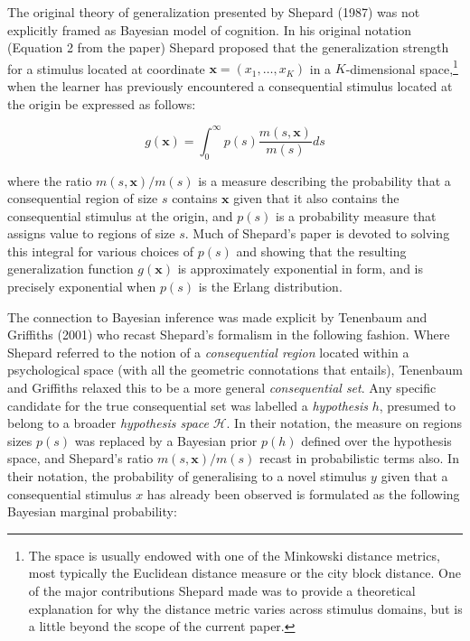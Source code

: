 \documentclass[english,doc]{apa6}
\begin{document}
The original theory of generalization presented by Shepard (1987) was not explicitly framed as Bayesian model of cognition. In his original notation (Equation 2 from the paper) Shepard proposed that the generalization strength for a stimulus located at coordinate \(\mathbf{x} = (x_1, \ldots, x_K)\) in a \(K\)-dimensional space,\footnote{The space is usually endowed with one of the Minkowski distance metrics, most typically the Euclidean distance measure or the city block distance. One of the major contributions Shepard made was to provide a theoretical explanation for why the distance metric varies across stimulus domains, but is a little beyond the scope of the current paper.} when the learner has previously encountered a consequential stimulus located at the origin be expressed as follows:

\begin{equation}
g(\mathbf{x}) = \int_0^\infty p(s) \frac{m(s, \mathbf{x})}{m(s)} ds
\end{equation}

\noindent
where the ratio \(m(s, \mathbf{x})/m(s)\) is a measure describing the probability that a consequential region of size \(s\) contains \(\mathbf{x}\) given that it also contains the consequential stimulus at the origin, and \(p(s)\) is a probability measure that assigns value to regions of size \(s\). Much of Shepard's paper is devoted to solving this integral for various choices of \(p(s)\) and showing that the resulting generalization function \(g(\mathbf{x})\) is approximately exponential in form, and is precisely exponential when \(p(s)\) is the Erlang distribution.

The connection to Bayesian inference was made explicit by Tenenbaum and Griffiths (2001) who recast Shepard's formalism in the following fashion. Where Shepard referred to the notion of a \emph{consequential region} located within a psychological space (with all the geometric connotations that entails), Tenenbaum and Griffiths relaxed this to be a more general \emph{consequential set}. Any specific candidate for the true consequential set was labelled a \emph{hypothesis} \(h\), presumed to belong to a broader \emph{hypothesis space} \(\mathcal{H}\). In their notation, the measure on regions sizes \(p(s)\) was replaced by a Bayesian prior \(p(h)\) defined over the hypothesis space, and Shepard's ratio \(m(s, \mathbf{x})/m(s)\) recast in probabilistic terms also. In their notation, the probability of generalising to a novel stimulus \(y\) given that a consequential stimulus \(x\) has already been observed is formulated as the following Bayesian marginal probability:
\end{document}
